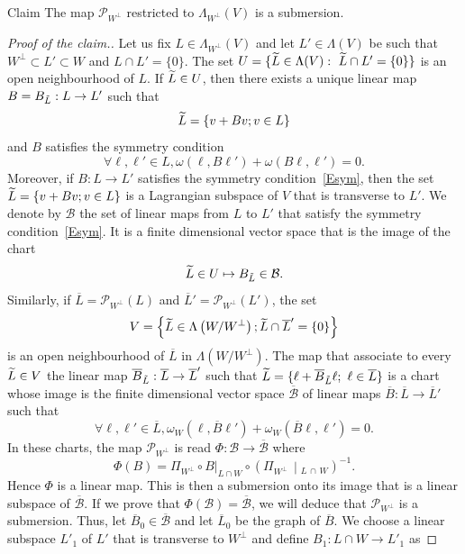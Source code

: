 \documentclass[AHL, Unicode, longabstracts, published]{cedram}
\renewcommand*\P{\mathcal{P}}
\newcommand*\cb{\mathcal{B}}
\let\oldtilde\tilde
\renewcommand*{\tilde}[1]{\mathchoice{\widetilde{#1}}{\widetilde{#1}}{\oldtilde{#1}}{\oldtilde{#1}}}
\let\oldforall\forall
\renewcommand*{\forall}{\mathrel{\oldforall}}
\begin{document}
\begin{enonce}{Claim}
The map $\P_{W^\perp}$ restricted to $\Lambda_{W^\perp}(V)$ is a submersion.
\end{enonce}
\begin{proof}[Proof of the claim.]
Let us fix $L\in\Lambda_{W^\perp}(V)$ and let $L'\in\Lambda(V)$ be such that $W^\perp\subset L'\subset W$ and $L\cap L'=\{0\}$. The set $U=\{ \tilde L\in\Lambda(V) :\ \tilde L\cap L'=\{0\} \}$ is an open neighbourhood of $L$. If $\tilde L\in U$, then there exists a unique linear map $B=B_{\tilde L}: L\to L'$ such that
\[
\tilde L=\{ v+Bv; v\in L\}
\]
and $B$ satisfies the symmetry condition
\begin{equation}\label{Esym}
\forall \ell, \ell'\in L, \omega(\ell, B\ell')+\omega(B\ell, \ell')=0.
\end{equation}
Moreover, if $B:L\to L'$ satisfies the symmetry condition~\eqref{Esym}, then the set $\tilde L=\{ v+Bv; v\in L\}$ is a Lagrangian subspace of $V$ that is transverse to $L'$.\newline
We denote by $\cb$ the set of linear maps from $L$ to $L'$ that satisfy the symmetry condition~\eqref{Esym}. It is a finite dimensional vector space that is the image of the chart
\[
\tilde L\in U\mapsto B_{\tilde L}\in \cb.
\]
Similarly, if $\overline{L}=\P_{W^\bot}(L)$ and $\overline{L}'=\P_{W^\bot}(L')$, the set
\[
V=\left\{\tilde L\in \Lambda\left(W/W^\bot\right); \tilde L\cap \overline{L}'=\{ 0\}\right\}
\]
is an open neighbourhood of $\overline{L}$ in $\Lambda(W/W^\bot)$. The map that associate to every $\tilde L\in V$ the linear map $\overline B_{\tilde L}:\overline{L}\to \overline{L}'$ such that $\tilde L=\{\ell+\overline B_{\tilde L}\ell;\ \ell\in\overline L\}$ is a chart whose image is the finite dimensional vector space $\overline{\cb}$ of linear maps $\overline B:\overline{L}\to \overline{L}'$ such that
\[
\forall \ell, \ell'\in \overline{L},\omega_W(\ell, \overline B\ell')+\omega_W(\overline B\ell, \ell')=0.
\]
In these charts, the map $\P_{W^\bot}$ is read $\Phi: \cb\to\overline{\cb} $ where
\[
\Phi(B)=\Pi_{W^\perp}\circ B|_{L\cap W}\circ \left(\Pi_{W^\perp}\,\middle|_{L\,\cap\,W}\right)^{-1}.
\]
Hence $\Phi$ is a linear map. This is then a submersion onto its image that is a linear subspace of $\overline{\cb}$. If we prove that $\Phi(\cb)=\overline{\cb}$, we will deduce that $\P_{W^\bot}$ is a submersion. Thus, let $\overline{B}_0\in \overline{\cb}$ and let $\overline{L}_0$ be the graph of $\overline{B}$. We choose a linear subspace $L'_1$ of $L'$ that is transverse to $W^\bot$ and define $B_1:L\cap W\to L'_1$ as

\end{proof}
\end{document}
